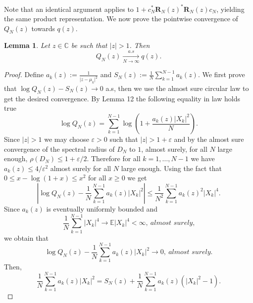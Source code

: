 \documentclass[12pt,a4paper]{amsart}
\theoremstyle{plain} %
\newtheorem{lemma}[theorem]{Lemma}
\newcommand{\E}{\mathbb{E}}
\newcommand{\C}{\mathbb{C}}
\begin{document}
Note that an identical argument applies to $1+c_N^*\mathbf{R}_{N}(z)^*\mathbf{R}_{N}(z)c_N$, yielding the same product representation. We now prove the pointwise convergence of $Q_N(z)$ towards $q(z)$.
\begin{lemma}
    Let $z\in \C$ be such that $\lvert z \lvert >1$. Then 
    \begin{equation*}
        Q_N(z)\xrightarrow[N\rightarrow\infty]{a.s}q(z).
    \end{equation*}
\end{lemma}
\begin{proof}
    Define $a_k(z):=\frac{1}{\lvert z-\mu_k \lvert^2}$ and $S_N(z):=\frac{1}{N}\sum_{k=1}^{N-1}a_k(z)$. We first prove that $\log Q_N(z)-S_N(z)\rightarrow 0$ a.s, then we use the almost sure circular law to get the desired convergence. By Lemma 12 the following equality in law holds true 
    \begin{equation*}
        \log Q_N(z)=\sum_{k=1}^{N-1}\log \left(1+\frac{a_k(z)\lvert X_k \lvert^2}{N}\right).
    \end{equation*}
    Since $\lvert z \lvert >1$ we may choose $\varepsilon>0$ such that $\lvert z\lvert >1+\varepsilon$ and by the almost sure convergence of the spectral radius of $D_N$ to $1$, almost surely, for all $N$ large enough, $\rho(D_N)\leq 1 + \varepsilon/2.$ Therefore for all $k=1,\ldots,N-1$ we have $a_k(z)\leq 4/\varepsilon^2$ almost surely for all $N$ large enough. Using the fact that $0 \leq x-\log(1+x)\leq x^2$ for all $x\geq 0$ we get 
    \begin{equation*}
       \left \lvert \log Q_N(z)-\frac{1}{N}\sum_{k=1}^{N-1}a_k(z)\lvert X_k \lvert^2 \right\lvert \leq \frac{1}{N^2}\sum_{k=1}^{N-1}a_k(z)^2\lvert X_k \lvert^4.
    \end{equation*}
    Since $a_k(z)$ is eventually uniformly bounded and 
    \begin{equation*}
        \frac{1}{N}\sum_{k=1}^{N-1}\lvert X_k \lvert^4 \rightarrow \E\lvert X_k \lvert^4<\infty, \ \textit{almost surely,}
    \end{equation*}
    we obtain that
    \begin{equation*}
        \log Q_N(z) - \frac{1}{N}\sum_{k=1}^{N-1}a_k(z)\lvert X_k \lvert^2 \rightarrow0, \ \textit{almost surely.}
    \end{equation*}
    Then, 
    \begin{equation*}
        \frac{1}{N}\sum_{k=1}^{N-1}a_k(z) \lvert X_k \lvert^2= S_N(z) + \frac{1}{N}\sum_{k=1}^{N-1}a_k(z)(\lvert X_k \lvert^2-1). 
    \end{equation*}

\end{proof}
\end{document}
